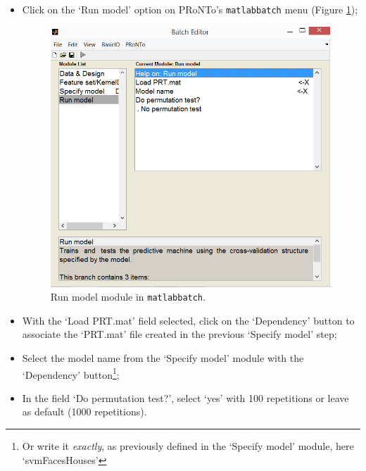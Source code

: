 \begin{itemize}

	\item Click on the `Run model' option on PRoNTo's {\tt matlabbatch} menu (Figure \ref{fig:batchRun});
	
	\begin{figure}[h!]
	\centering
		\includegraphics[scale=0.6]{images/Tutorial/classification/batchRun.png}
	\caption{Run model module in {\tt matlabbatch}.}
	\label{fig:batchRun}
\end{figure}
	
	
	\item  With the `Load PRT.mat' field selected, click on the `Dependency' button to associate the `PRT.mat' file created in the previous `Specify model' step;
	
	\item Select the model name from the `Specify model' module with the `Dependency' button\footnote{Or write it {\it exactly}, as previously defined in the `Specify model' module, here `svmFacesHouses'};

	\item In the field `Do permutation test?', select `yes' with 100 repetitions or leave as default (1000 repetitions).

\end{itemize}

